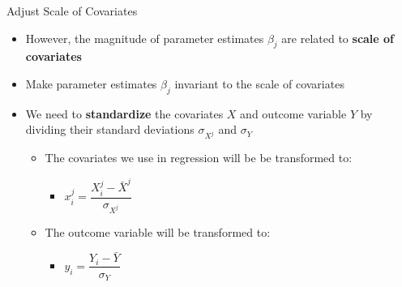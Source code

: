 \documentclass[dvipsnames,hyperref={pdfpagelabels=false}]{beamer}
\begin{document}
\begin{frame}{Adjust Scale of Covariates}{}
	\begin{itemize}
		
		\item However, the magnitude of parameter estimates $\beta_{j}$ are related to \textbf{scale of covariates}
		\vspace{0.2cm}
		\item Make parameter estimates $\beta_{j}$ invariant to the scale of covariates
		\vspace{0.2cm}
		\item We need to \textbf{standardize} the covariates $X$ and outcome variable $Y$ by dividing their standard deviations $\sigma_{X^{j}}$ and $\sigma_{Y}$
		\vspace{0.2cm}
		\begin{itemize}
			\item The covariates we use in regression will be be transformed to: 
			\vspace{0.2cm} 
			\begin{itemize}
				\item $x^{j}_{i} = \dfrac{X^{j}_{i}-\bar{X}^{j}}{\sigma_{X^{j}}}$
			\end{itemize}
			\vspace{0.2cm} 
			\item The outcome variable will be transformed to: 
			\vspace{0.2cm} 
			\begin{itemize}
				\item $y_{i} = \dfrac{Y_{i}-\bar{Y}}{\sigma_{Y}}$
			\end{itemize}
			
		\end{itemize}
	\end{itemize}
\end{frame}
\end{document}
